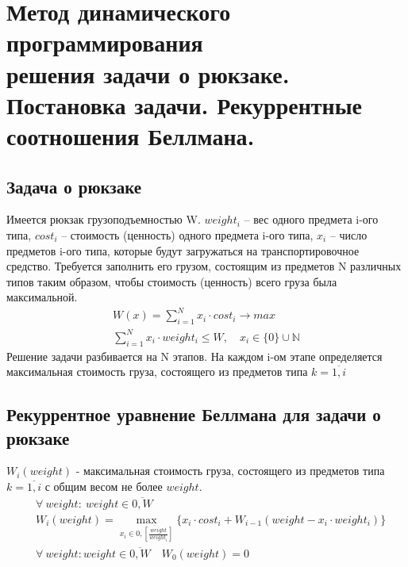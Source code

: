 \documentclass[17pt]{extarticle}
\begin{document}
\section{Метод динамического программирования \\ решения задачи о рюкзаке. Постановка задачи. Рекуррентные соотношения Беллмана.}
\subsection*{Задача о рюкзаке}
Имеется рюкзак грузоподъемностью W.
$weight_i$ – вес одного предмета i-ого типа,
$cost_i$ – стоимость (ценность) одного предмета i-ого типа,
$x_i$ – число предметов i-ого типа, которые будут загружаться на транспортировочное средство.
Требуется заполнить его грузом, состоящим из предметов N различных типов таким образом, чтобы стоимость (ценность) всего груза была максимальной.
\[
    \begin{aligned}
        W(x)=\sum_{i=1}^{N} x_i \cdot cost_i \rightarrow max \\
        \sum_{i=1}^{N} x_i \cdot weight_i \leq W, \quad x_i \in \{0\} \cup \mathbb{N}
    \end{aligned}
\]
Решение задачи разбивается на N этапов. На каждом i-ом этапе определяется максимальная стоимость груза,
состоящего из предметов типа $k=\overline{1,i}$
\subsection*{Рекуррентное уравнение Беллмана для задачи о рюкзаке}
$W_i(weight)$ - максимальная стоимость груза, состоящего из предметов типа $k=\overline{1,i}$ с общим весом не более $weight$.
\[
    \begin{aligned}
         & \forall \ weight \colon \ weight \in \overline{0,W}                                                                                         \\
         & W_i(weight) = \max_{x_i \in \overline{0, \left[\frac{weight}{weight_i}\right]}} \{x_i \cdot cost_i + W_{i-1}(weight - x_i \cdot weight_i)\} \\
         & \forall \ weight \colon weight \in \overline{0,W} \quad  W_0(weight)=0                                                                      \\
    \end{aligned}
\]
\end{document}
